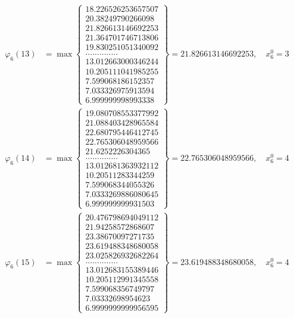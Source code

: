 \documentclass{article}
\begin{document}
\begin{align*}
  
  
  
\varphi_{6}(13) &= \max \left\{ \begin{array}{c}
18.226526253657507 \\
 20.38249790266098 \\
 21.826613146692253 \\
 21.364701746713806 \\
 19.830251051340092 \\
 .............. \\
 13.012663000346244 \\
 10.205111041985255 \\
 7.599068186152357 \\
 7.033326975913594 \\
 6.999999998993338
\end{array} \right\} = 21.826613146692253, \quad x_{6}^0 = 3\\
  
  
  
  
\varphi_{6}(14) &= \max \left\{ \begin{array}{c}
19.080708553377992 \\
 21.088403428965584 \\
 22.680795446412745 \\
 22.765306048959566 \\
 21.6252226304365 \\
 .............. \\
 13.012681363932112 \\
 10.20511283344259 \\
 7.599068344055326 \\
 7.0333269886080645 \\
 6.999999999931503
\end{array} \right\} = 22.765306048959566, \quad x_{6}^0 = 4\\
  
  
  
  
\varphi_{6}(15) &= \max \left\{ \begin{array}{c}
20.476798694049112 \\
 21.94258572868607 \\
 23.38670097271735 \\
 23.619488348680058 \\
 23.025826932682264 \\
 .............. \\
 13.012683155389446 \\
 10.205112991345558 \\
 7.599068356749797 \\
 7.03332698954623 \\
 6.9999999999956595
\end{array} \right\} = 23.619488348680058, \quad x_{6}^0 = 4\\
  

\end{align*}
\end{document}
